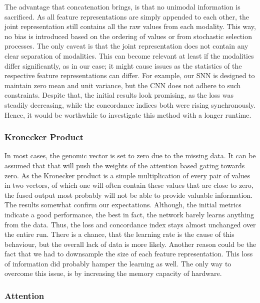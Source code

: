 The advantage that concatenation brings, is that no unimodal information is sacrificed. As all feature representations are simply appended to each other, the joint representation still contains all the raw values from each modality. This way, no bias is introduced based on the ordering of values or from stochastic selection processes. The only caveat is that the joint representation does not contain any clear separation of modalities. This can become relevant at least if the modalities differ significantly, as in our case; it might cause issues as the statistics of the respective feature representations can differ. For example, our SNN is designed to maintain zero mean and unit variance, but the CNN does not adhere to such constraints.
Despite that, the initial results look promising, as the loss was steadily decreasing, while the concordance indices both were rising synchronously. Hence, it would be worthwhile to investigate this method with a longer runtime.

\subsubsection{Kronecker Product}

In most cases, the genomic vector is set to zero due to the missing data. It can be assumed that that will push the weights of the attention based gating towards zero. As the Kronecker product is a simple multiplication of every pair of values in two vectors, of which one will often contain these values that are close to zero, the fused output most probably will not be able to provide valuable information. The results somewhat confirm our expectations. Although, the initial metrics indicate a good performance, the best in fact, the network barely learns anything from the data. Thus, the loss and concordance index stays almost unchanged over the entire run. There is a chance, that the learning rate is the cause of this behaviour, but the overall lack of data is more likely. Another reason could be the fact that we had to downsample the size of each feature representation. This loss of information did probably hamper the learning as well. The only way to overcome this issue, is by increasing the memory capacity of hardware.

\subsubsection{Attention}


